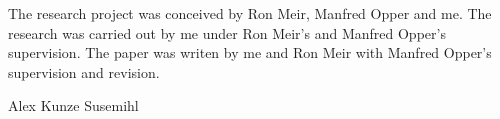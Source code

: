 \documentclass[10pt]{article}
\begin{document}
The research project was conceived by Ron Meir, Manfred Opper and me. The research was carried out by me under Ron Meir's and Manfred Opper's supervision. The paper was writen
by me and Ron Meir with Manfred Opper's supervision and revision.

\vspace{3.5in}

\begin{flushright}
\Large{Alex Kunze Susemihl}
\end{flushright}
\end{document}
